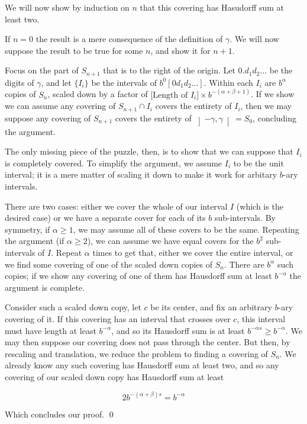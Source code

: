\documentclass[11pt, reqno]{amsart}
\begin{document}
We will now show by induction on $n$ that this covering has Hasudorff sum at least two.

If $n = 0$ the result is a mere consequence of the definition of $\gamma$. We will now suppose the result to be true for some $n$, and show it for $n+1$.

Focus on the part of $S_{n+1}$ that is to the right of the origin. Let $0.d_1 d_2 \dots$ be the digits of $\gamma$, and let $\{I_i\}$ be the intervals of $b^0 [0 d_1 d_2 \dots]$. Within each $I_i$ are $b^\alpha$ copies of $S_n$, scaled down by a factor of $\text{[Length of $I_i$]} \times b^{-(\alpha + \beta + 1)}$. If we show we can assume any covering of $S_{n+1} \cap I_i$ covers the entirety of $I_i$, then we may suppose any covering of $S_{n+1}$ covers the entirety of $\left]-\gamma, \gamma\right[ = S_0$, concluding the argument.

The only missing piece of the puzzle, then, is to show that we can suppose that $I_i$ is completely covered. To simplify the argument, we assume $I_i$ to be the unit interval; it is a mere matter of scaling it down to make it work for arbitary $b$-ary intervals.

There are two cases: either we cover the whole of our interval $I$ (which is the desired case) or we have a separate cover for each of its $b$ sub-intervals. By symmetry, if $\alpha \geq 1$, we may assume all of these covers to be the same. Repeating the argument (if $\alpha \geq 2$), we can assume we have equal covers for the $b^2$ sub-intervals of $I$. Repeat $\alpha$ times to get that, either we cover the entire interval, or we find some covering of one of the scaled down copies of $S_n$. There are $b^\alpha$ such copies; if we show any covering of one of them has Hausdorff sum at least $b^{-\alpha}$ the argument is complete.

Consider such a scaled down copy, let $c$ be its center, and fix an arbitrary $b$-ary covering of it. If this covering has an interval that crosses over $c$, this interval must have length at least $b^{-\alpha}$, and so its Hausdorff sum is at least $b^{- \alpha s} \geq b^{-\alpha}$. We may then suppose our covering does not pass through the center. But then, by rescaling and translation, we reduce the problem to finding a covering of $S_n$. We already know any such covering has Hausdorff sum at least two, and so any covering of our scaled down copy has Hausdorff sum at least

\[ 2 b^{-(\alpha + \beta) s} = b^{-\alpha} \]

Which concludes our proof. \qed
\end{document}
